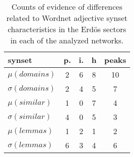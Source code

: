 \begin{table}[h!]
\begin{center}
\begin{tabular}{| l || c | c | c || c |}\hline
{\bf synset} & {\bf p.} & {\bf i.} & {\bf h} & {\bf peaks} \\\hline\hline
$\mu(domains)$ & 2  & 6  & 8  & 10 \\
$\sigma(domains)$ & 2  & 4  & 5  & 7 \\\hline
$\mu(similar)$ & 1  & 0  & 7  & 4 \\
$\sigma(similar)$ & 4  & 0  & 5  & 3 \\\hline
$\mu(lemmas)$ & 1  & 2  & 1  & 2 \\
$\sigma(lemmas)$ & 6  & 3  & 4  & 6 \\\hline
\end{tabular}
\caption{Counts of evidence of differences related to Wordnet adjective synset characteristics in the Erd\"os sectors in each of the analyzed networks.}
\end{center}
\end{table}